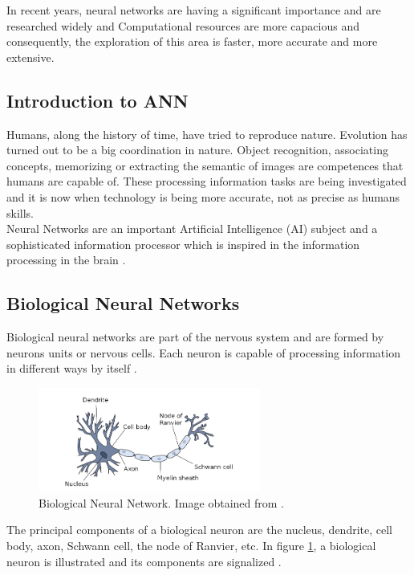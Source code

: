 In recent years, neural networks are having a significant importance and are researched widely and Computational resources are more capacious and consequently, the exploration of this area is faster, more accurate and more extensive.

\subsection{Introduction to ANN}
Humans, along the history of time, have tried to reproduce nature. Evolution has turned out to be a big coordination in nature. Object recognition, associating concepts, memorizing or extracting the semantic of images are competences that humans are capable of. These processing information tasks are being investigated and it is now when technology is being more accurate, not as precise as humans skills.\\

Neural Networks are an important Artificial Intelligence (AI) subject and a sophisticated information processor which is inspired in the information processing in the brain \cite{Rojas}.

\subsection{Biological Neural Networks}
Biological neural networks are part of the nervous system and are formed by neurons units or nervous cells. Each neuron is capable of processing information in different ways by itself \cite{Rojas}.\\

\begin{figure}[htb]
\centering
\includegraphics[width=0.65\textwidth]{images_miscelaneus/neuron.png}
\caption{Biological Neural Network. Image obtained from \cite{BINN}.} \label{fig:Bio-Neuron}
\end{figure}

The principal components of a biological neuron are the nucleus, dendrite, cell body, axon, Schwann cell, the node of Ranvier, etc. In figure \ref{fig:Bio-Neuron}, a biological neuron is illustrated and its components are signalized \cite{BINN}.\\

